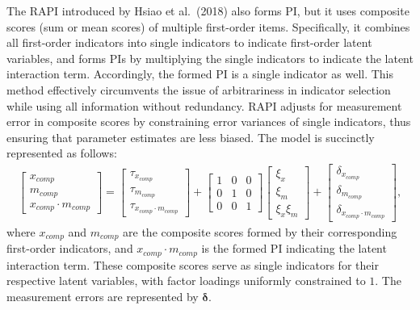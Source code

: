 \documentclass[
  man]{apa7}
\begin{document}
The RAPI introduced by Hsiao et al.~(2018) also forms PI, but it uses composite scores (sum or mean scores) of multiple first-order items. Specifically, it combines all first-order indicators into single indicators to indicate first-order latent variables, and forms PIs by multiplying the single indicators to indicate the latent interaction term. Accordingly, the formed PI is a single indicator as well. This method effectively circumvents the issue of arbitrariness in indicator selection while using all information without redundancy. RAPI adjusts for measurement error in composite scores by constraining error variances of single indicators, thus ensuring that parameter estimates are less biased. The model is succinctly represented as follows:
\begin{align}
    \begin{bmatrix}
        x_{comp} \\
        m_{comp} \\
        x_{comp} \cdot m_{comp}
    \end{bmatrix} = 
    \begin{bmatrix}
        \tau_{x_{comp}} \\
        \tau_{m_{comp}} \\ 
        \tau_{x_{comp} \cdot m_{comp}} 
    \end{bmatrix} + 
    \begin{bmatrix}
        1 & 0 & 0 \\
        0 & 1 & 0 \\ 
        0 & 0 & 1 
    \end{bmatrix}
    \begin{bmatrix}
        \xi_{x} \\  
        \xi_{m} \\ 
        \xi_{x}\xi_{m}
    \end{bmatrix} +
    \begin{bmatrix}
        \delta_{x_{comp}} \\
        \delta_{m_{comp}} \\ 
        \delta_{x_{comp} \cdot m_{comp}}
    \end{bmatrix},
\end{align}
where \(x_{comp}\) and \(m_{comp}\) are the composite scores formed by their corresponding first-order indicators, and \(x_{comp} \cdot m_{comp}\) is the formed PI indicating the latent interaction term. These composite scores serve as single indicators for their respective latent variables, with factor loadings uniformly constrained to \(1\). The measurement errors are represented by \(\mathbf{\delta}\).
\end{document}
